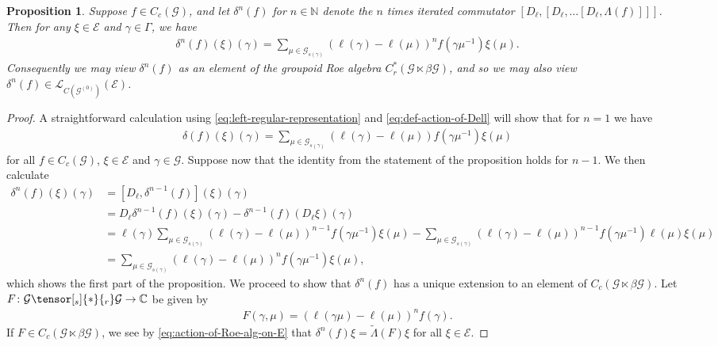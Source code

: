 \documentclass[11pt,a4paper,oneside,final,reqno]{amsart}
\newtheorem{proposition}[lemma]{Proposition}
\theoremstyle{definition}
\newcommand{\G}{\mathcal{G}}
\newcommand{\Go}{\mathcal{G}^{(0)}}
\newcommand{\E}{\mathcal{E}}
\newcommand{\Cred}{C_{r}^{*}}
\newcommand{\C}{\mathbb{C}}
\newcommand{\N}{\mathbb{N}}
\numberwithin{equation}{section}
\begin{document}
	\begin{proposition}\label{prop:iterated-commutator-adjointable}
		Suppose $f \in C_c (\G)$, and let $\delta^n (f)$ for $n \in \N$ denote the $n$ times iterated commutator $[D_\ell, [D_\ell, \ldots [D_\ell, \Lambda(f)]]]$. Then for any $\xi \in \E$ and $\gamma \in \Gamma$, we have
		\begin{align*}
			\delta^n(f)(\xi)(\gamma) = \sum_{\mu \in \G_{s(\gamma)}} (\ell(\gamma) - \ell(\mu))^n f(\gamma \mu^{-1}) \xi(\mu).
		\end{align*}
		Consequently we may view $\delta^n(f)$ as an element of the groupoid Roe algebra 
		$\Cred( \G \ltimes \beta\G)$,
		and so we may also view $\delta^n(f) \in \mathcal{L}_{C(\Go)}(\E)$. 
	\end{proposition}
	\begin{proof}
		A straightforward calculation using \eqref{eq:left-regular-representation} and \eqref{eq:def-action-of-Dell} will show that for $n=1$ we have
		\begin{align*}
			\delta(f)(\xi)(\gamma) = \sum_{\mu \in \G_{s(\gamma)}} (\ell(\gamma) - \ell(\mu)) f(\gamma \mu^{-1}) \xi(\mu)
		\end{align*}
		for all $f \in C_c(\G)$, $\xi \in \E$ and $\gamma \in \G$. Suppose now that the identity from the statement of the proposition holds for $n-1$. We then calculate
		\begin{align*}
			\delta^n(f)(\xi)(\gamma) &= [D_\ell, \delta^{n-1}(f)](\xi)(\gamma) \\
			&=D_\ell \delta^{n-1}(f)(\xi)(\gamma) - \delta^{n-1}(f) (D_\ell \xi)(\gamma) \\
			&= \ell(\gamma) \sum_{\mu \in \G_{s(\gamma)}} (\ell(\gamma) - \ell(\mu))^{n-1}f(\gamma \mu^{-1})\xi(\mu) - \sum_{\mu \in \G_{s(\gamma)}} (\ell(\gamma) - \ell(\mu))^{n-1}f(\gamma \mu^{-1})\ell(\mu)\xi(\mu) \\
			&= \sum_{\mu \in \G_{s(\gamma)}} (\ell(\gamma) - \ell(\mu))^{n}f(\gamma \mu^{-1})\xi(\mu),
		\end{align*}
		which shows the first part of the proposition. We proceed to show that  $\delta^n(f)$ has a unique extension to an element of 
		$C_c (\G \ltimes \beta\G)$. 
		Let $F\colon \G \tensor[_s]{*}{_r} \G \to \C$ be given by 
		\begin{align*}
			F(\gamma, \mu) = (\ell(\gamma \mu) - \ell(\mu))^n f(\gamma).
		\end{align*}
		If 
		$F \in C_c ( \G \ltimes \beta\G)$,
		we see by \eqref{eq:action-of-Roe-alg-on-E} 
		that $\delta^n (f) \xi = \tilde{\Lambda}(F) \xi$ for all $\xi \in \E$. 

\end{proof}
\end{document}
